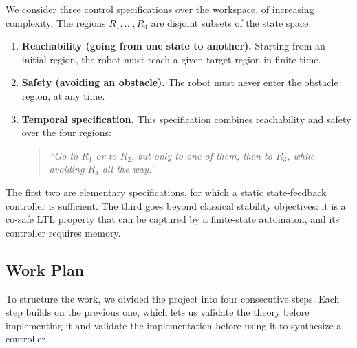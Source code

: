 \documentclass[11pt,a4paper]{article}
\begin{document}
We consider three control specifications over the workspace, of increasing complexity. The
regions $R_1,\dots,R_4$ are disjoint subsets of the state space.
\begin{enumerate}
  \item \textbf{Reachability (going from one state to another).} Starting from an initial
  region, the robot must reach a given target region in finite time.
  \item \textbf{Safety (avoiding an obstacle).} The robot must never enter the obstacle
  region, at any time.
  \item \textbf{Temporal specification.} This specification combines reachability and safety
  over the four regions:
  \begin{quote}
    \emph{``Go to $R_1$ or to $R_2$, but only to one of them, then to $R_3$,
    while avoiding $R_4$ all the way.''}
  \end{quote}
\end{enumerate}
The first two are elementary specifications, for which a static state-feedback controller is
sufficient. The third goes beyond classical stability objectives: it is a co-safe LTL property
that can be captured by a finite-state automaton, and its controller requires memory.

\subsection{Work Plan}

To structure the work, we divided the project into four consecutive steps. Each step builds
on the previous one, which lets us validate the theory before implementing it and validate
the implementation before using it to synthesize a controller.
\end{document}

